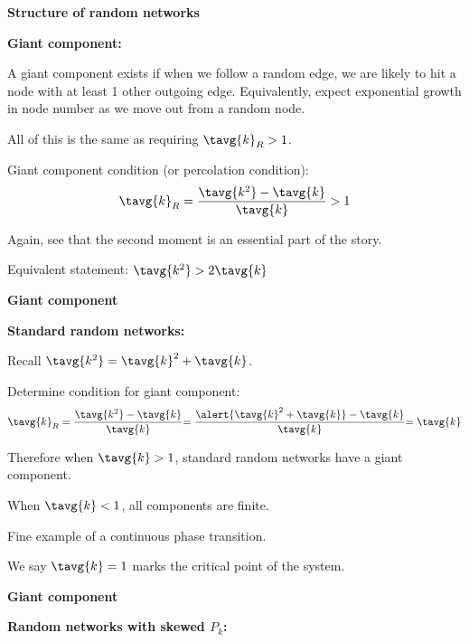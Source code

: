\begin{frame}[label=]
\begin{frame}[label=]
\begin{frame}[label=]
\begin{frame}[label=]
\begin{frame}[label=]
\begin{frame}[label=]
\begin{frame}[label=]
\begin{frame}[label=]
\begin{frame}[label=]
\begin{frame}[label=]
\begin{frame}[label=]
\begin{frame}[label=]
\begin{frame}[label=]
\begin{frame}[label=]
\begin{frame}[label=]
\begin{frame}[label=]
\begin{frame}[label=]
\begin{frame}[label=]
\begin{frame}[label=]
\begin{frame}[label=]
\begin{frame}[label=]
\begin{frame}[label=]
  \textbf{Structure of random networks}
  
  \textbf{Giant component:}
    
     
      A giant component exists if when
      we follow a random edge, we are likely
      to hit a node with \alert{at least 1} other
      outgoing edge.
     Equivalently, expect exponential growth in
      node number as we move out from 
      a random node.
     
      All of this is the same as requiring $\tavg{k}_R > 1$.
     
      \alert{Giant component condition} (or percolation condition):
      $$
      \tavg{k}_R 
      =
      \frac{\tavg{k^2}-\tavg{k}}{\tavg{k}}
      > 
      1
      $$
    
      Again, see that the second moment is an essential
      part of the story.
    
      Equivalent statement:
      $
      \tavg{k^2} > 2\tavg{k}
      $
    
    
  
  

\begin{frame}[label=]
  \textbf{Giant component}

  \textbf{Standard random networks:}
    
     
      Recall $\tavg{k^2} = \tavg{k}^2 + \tavg{k}$.
    
      Determine condition for giant component:
      $$
      \tavg{k}_R = 
      \frac{\tavg{k^2} - \tavg{k}}
      {\tavg{k}}
      {
        =
      \frac{\alert{\tavg{k}^2 + \tavg{k}} - \tavg{k}}
      {\tavg{k}}
      }
      {
        = \tavg{k}
      }
      $$
    
      Therefore when $\tavg{k} > 1$,
      standard random networks have a giant component.
    
      When $\tavg{k} < 1$,
      all components are finite.
    
      Fine example of a continuous
      {phase transition}.
    
      We say $\tavg{k}=1$ marks the critical point of the system.
    
  
  

\begin{frame}[label=]
  \textbf{Giant component}

  \textbf{Random networks with skewed $P_k$:}
    

\end{frame}
\end{frame}
\end{frame}
\end{frame}
\end{frame}
\end{frame}
\end{frame}
\end{frame}
\end{frame}
\end{frame}
\end{frame}
\end{frame}
\end{frame}
\end{frame}
\end{frame}
\end{frame}
\end{frame}
\end{frame}
\end{frame}
\end{frame}
\end{frame}
\end{frame}
\end{frame}
\end{frame}
